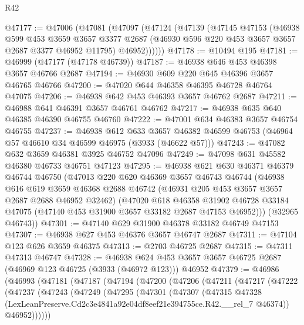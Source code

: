 \begin{lexlean}{R42}
\begin{coremodule}
@47177 := @47006
    (@47081
      (@47097
        (@47124
          (@47139
            (@47145
              @47153
              (@46938
                @599
                @453
                @3659
                @3657
                @3377
                @2687
                (@46930 @596 @220 @453 @3657 @3657 @2687 @3377 @46952 @11795)
                @46952))))))
@47178 := @10494 @195
@47181 := @46999 (@47177 (@47178 @46739))
@47187 := @46938 @646 @453 @46398 @3657 @46766 @2687
@47194 := @46930 @609 @220 @645 @46396 @3657 @46765 @46766
@47200 := @47020 @644 @46358 @46395 @46728 @46764 @47075
@47206 := @46938 @642 @453 @46393 @3657 @46762 @2687
@47211 := @46988 @641 @46391 @3657 @46761 @46762
@47217 := @46938 @635 @640 @46385 @46390 @46755 @46760
@47222 := @47001 @634 @46383 @3657 @46754 @46755
@47237 := @46938
    @612
    @633
    @3657
    @46382
    @46599
    @46753
    (@46964 @57 @46610 @34 @46599 @46975 (@3933 (@46622 @57)))
@47243 := @47082 @632 @3659 @46381 @3925 @46752 @47096
@47249 := @47098 @631 @45582 @46380 @46733 @46751 @47123
@47295 := @46938
    @621
    @630
    @46371
    @46379
    @46744
    @46750
    (@47013
      @220
      @620
      @46369
      @3657
      @46743
      @46744
      (@46938
        @616
        @619
        @3659
        @46368
        @2688
        @46742
        (@46931 @205 @453 @3657 @3657 @2687 @2688 @46952 @32462)
        (@47020
          @618
          @46358
          @31902
          @46728
          @33184
          @47075
          (@47140 @453 @31900 @3657 @33182 @2687 @47153 @46952)))
      (@32965 @46743))
@47301 := @47140 @629 @31900 @46378 @33182 @46749 @47153
@47307 := @46938 @627 @453 @46376 @3657 @46747 @2687
@47311 := @47104 @123 @626 @3659 @46375
@47313 := @2703 @46725 @2687
@47315 := @47311 @47313 @46747
@47328 := @46938
    @624
    @453
    @3657
    @3657
    @46725
    @2687
    (@46969 @123 @46725 (@3933 (@46972 @123)))
    @46952
@47379 := @46986
    (@46993
      (@47181
        (@47187
          (@47194
            (@47200
              (@47206
                (@47211
                  (@47217
                    (@47222
                      (@47237
                        (@47243
                          (@47249
                            (@47295
                              (@47301
                                (@47307
                                  (@47315
                                    @47328
                                    (LexLeanPreserve.Cd2c3e4841a92e04df8eef21e394755ce.R42.__rel_7
                                      @46374))
                                  @46952))))))

\end{coremodule}
\end{lexlean}

